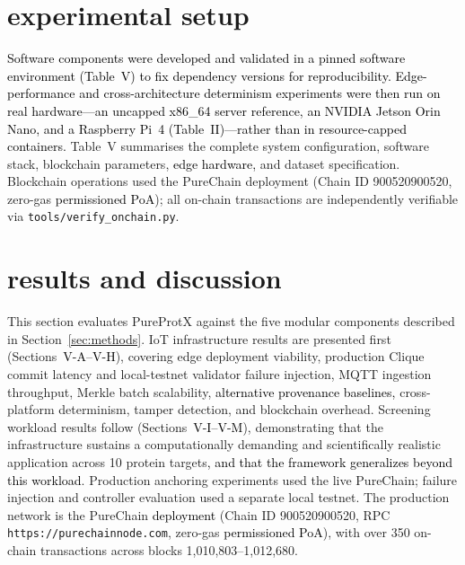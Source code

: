 \documentclass[conference]{IEEEtran}
\newcommand{\rev}[2]{#2}
\begin{document}
\begin{table}[!htbp]
{\begin{tabular}{p{2.6cm} p{2.8cm} p{4.5cm}}
\bottomrule
\end{tabular}}
\end{table}
\section{\textbf{experimental setup}}
\label{sec:experiments}
\textcolor{black}{Software components were developed and validated in a pinned
software environment (Table~V) to fix dependency versions for reproducibility.
Edge-performance and cross-architecture determinism experiments were then run
on real hardware---an uncapped x86\_64 server reference, an NVIDIA Jetson
Orin Nano, and a Raspberry Pi~4 (Table~II)---rather than in resource-capped
containers.} Table~V summarises the complete system configuration, software
stack, blockchain parameters, \textcolor{black}{edge hardware,} and dataset
specification. Blockchain operations used the PureChain
deployment (Chain ID 900520900520, zero-gas \textcolor{black}{permissioned
PoA}); all on-chain transactions are independently verifiable via
\texttt{tools/verify\_onchain.py}.

\section{\textbf{results and discussion}}
\label{sec:results}

This section evaluates PureProtX against the five modular
components described in Section~\ref{sec:methods}.
IoT infrastructure results are presented first
(Sections~\textcolor{black}{V-A–V-H}), covering edge deployment viability,
\rev{R2.4}{production Clique commit latency and local-testnet validator failure injection}, MQTT
ingestion throughput, Merkle batch scalability, \textcolor{black}{alternative
provenance baselines,} cross-platform determinism, tamper detection, and
blockchain overhead. Screening workload results follow
(Sections~\textcolor{black}{V-I–V-M}), demonstrating that the infrastructure
sustains a computationally demanding and scientifically realistic application
across 10 protein targets\textcolor{black}{, and that the framework
generalizes beyond this workload}.
\rev{R1.3}{Production anchoring experiments used the live PureChain; failure injection and controller evaluation used a separate local testnet. The production network is the PureChain}
\textcolor{black}{deployment} (Chain ID 900520900520, RPC
\texttt{https://purechainnode.com}, zero-gas
\textcolor{black}{permissioned PoA}), with over 350 on-chain transactions
across blocks 1,010,803–1,012,680.
\end{document}
